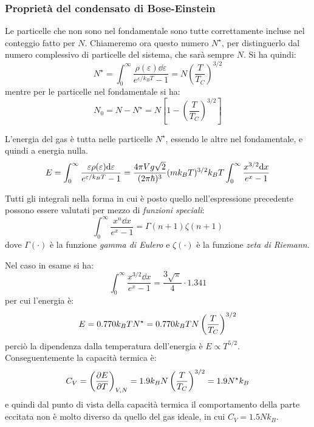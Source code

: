 \subsubsection{Proprietà del condensato di Bose-Einstein}

Le particelle che non sono nel fondamentale sono tutte correttamente incluse nel conteggio fatto per $ N $. Chiameremo ora questo numero $ N^\star $, per distinguerlo dal numero complessivo di particelle del sistema, che sarà sempre $ N $.
Si ha quindi:
\begin{equation*}
N^\star = \int_{0}^{\infty}  \frac{\rho(\varepsilon) \dd \varepsilon}{ e^{\varepsilon/k_B T} - 1} = N \left(\frac{T}{T_C}\right)^{3/2}
\end{equation*}
mentre per le particelle nel fondamentale si ha:
\begin{equation*}
	N_0 = N - N^\star = N \left[1 - \left(\frac{T}{T_C}\right)^{3/2}\right]
\end{equation*}

L'energia del gas è tutta nelle particelle $ N^\star $, essendo le altre nel fondamentale, e quindi a energia nulla.
\begin{equation*}
	E = \int_{0}^{\infty}  \frac{\varepsilon \rho(\varepsilon) \dd \varepsilon}{ e^{\varepsilon/k_B T} - 1} = \frac{4\pi V g \sqrt{2} }{(2\pi \hbar)^3} (mk_B T)^{3/2} k_B T \int_{0}^{\infty}  \frac{x^{3/2} \dd x}{ e^x - 1}
\end{equation*}

\begin{note}
	Tutti gli integrali nella forma in cui è posto quello nell'espressione precedente possono essere valutati per mezzo di \textit{funzioni speciali}:
	\begin{equation*}
		\int_{0}^{\infty}  \frac{x^n \dd x}{ e^x - 1} = \Gamma(n+1) \zeta(n+1)
	\end{equation*}
	dove $ \Gamma(\cdot) $ è la funzione \textit{gamma di Eulero} e $ \zeta(\cdot) $ è la funzione \textit{zeta di Riemann}.
\end{note}

Nel caso in esame si ha:
\begin{equation*}
	\int_{0}^{\infty}  \frac{x^{3/2} \dd x}{ e^x - 1} = \frac{3\sqrt{\pi}}{4} \cdot 1.341
\end{equation*}
per cui l'energia è:
\begin{equation*}
	E = 0.770 k_B T N^{\star} = 0.770 k_B T N  \left(\frac{T}{T_C}\right)^{3/2}
\end{equation*}
perciò la dipendenza dalla temperatura dell'energia è $ E \propto T^{5/2} $. Conseguentemente la capacità termica è:
\begin{equation*}
	C_V = \left(\frac{\partial {E}}{\partial {T}}\right)_{V,N} = 1.9 k_B N  \left(\frac{T}{T_C}\right)^{3/2} = 1.9 N^\star k_B 
\end{equation*}
e quindi dal punto di vista della capacità termica il comportamento della parte eccitata non è molto diverso da quello del gas ideale, in cui $C_V = 1.5 N k_B$.

